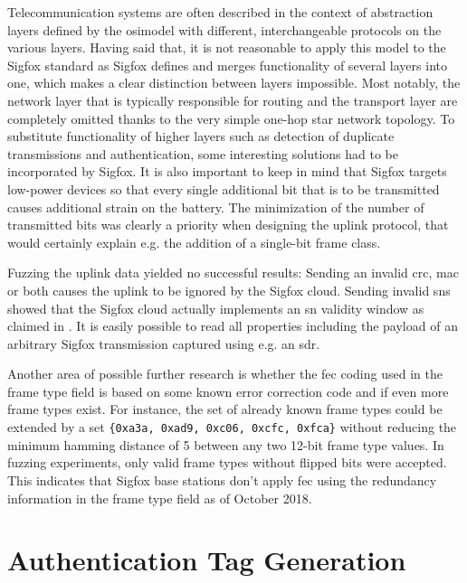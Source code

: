 Telecommunication systems are often described in the context of abstraction layers defined by the \gls{osimodel} \cite{osimodel} with different, interchangeable protocols on the various layers.
Having said that, it is not reasonable to apply this model to the Sigfox standard as Sigfox defines and merges functionality of several layers into one, which makes a clear distinction between layers impossible.
Most notably, the network layer that is typically responsible for routing and the transport layer are completely omitted thanks to the very simple one-hop star network topology.
To substitute functionality of higher layers such as detection of duplicate transmissions and authentication, some interesting solutions had to be incorporated by Sigfox.
It is also important to keep in mind that Sigfox targets low-power devices so that every single additional bit that is to be transmitted causes additional strain on the battery.
The minimization of the number of transmitted bits was clearly a priority when designing the uplink protocol, that would certainly explain e.g. the addition of a single-bit frame class.

Fuzzing the uplink data yielded no successful results: Sending an invalid \gls{crc}, \gls{mac} or both causes the uplink to be ignored by the Sigfox cloud.
Sending invalid \glspl{sn} showed that the Sigfox cloud actually implements an \gls{sn} validity window as claimed in \cite[Section 5.1.1]{sigfox_tech}.
It is easily possible to read all properties including the payload of an arbitrary Sigfox transmission captured using e.g. an \gls{sdr}.

Another area of possible further research is whether the \gls{fec} coding used in the frame type field is based on some known error correction code and if even more frame types exist.
For instance, the set of already known frame types could be extended by a set \texttt{\{0xa3a, 0xad9, 0xc06, 0xcfc, 0xfca\}} without reducing the minimum hamming distance of 5 between any two 12-bit frame type values.
In fuzzing experiments, only valid frame types without flipped bits were accepted.
This indicates that Sigfox base stations don't apply \gls{fec} using the redundancy information in the frame type field as of October 2018.

\FloatBarrier
\section{Authentication Tag Generation}
\label{sec:uplink_mac}
